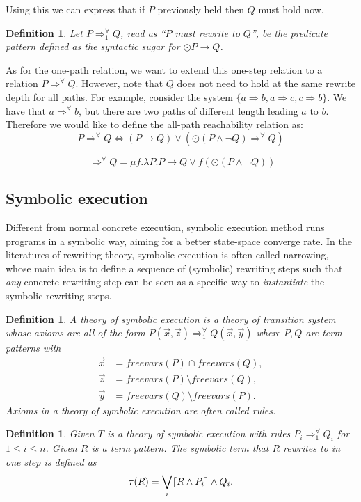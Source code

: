 \documentclass{article}
\theoremstyle{plain}
\newtheorem{defn}[thm]{Definition}
\DeclarePairedDelimiter\ceil{\lceil}{\rceil}
\def\prev{\odot}
\def\fv{\textit{freevars}}
\def\To1{\Rightarrow^{\forall}_1}
\begin{document}
Using this we can express that if $P$ previously held then $Q$ must hold now.

\begin{defn}
  Let $P \Rightarrow^\forall_1 Q$, read as ``$P$ must rewrite to $Q$'', be the predicate pattern defined as the syntactic sugar for $\prev P \to Q$.
\end{defn}

As for the one-path relation, we want to extend this one-step relation to a relation $P \Rightarrow^\forall Q$.  However, note that $Q$ does not need to hold at the same rewrite depth for all paths.  For example, consider the system $\{a \Rightarrow b, a\Rightarrow c, c\Rightarrow b\}$. We have that $a\Rightarrow^\forall b$, but there are two paths of different length leading $a$ to $b$. Therefore we would like to define the all-path reachability relation as:
\[P \Rightarrow^\forall Q \iff (P\to Q) \vee (\prev (P\wedge \neg Q) \Rightarrow^\forall Q)\]

\[\_ \Rightarrow^\forall Q = \mu f. \lambda P. P\to Q\vee f(\prev(P\wedge \neg Q))\]

\subsection{Symbolic execution}

Different from normal concrete execution, symbolic execution method runs programs in a symbolic way, aiming for a better state-space converge rate. In the literatures of rewriting theory, symbolic execution is often called narrowing, whose main idea is to define a sequence of (symbolic) rewriting steps such that \emph{any} concrete rewriting step can be seen as a specific way to \emph{instantiate} the symbolic rewriting steps. 

\begin{defn}
	A theory of symbolic execution is a theory of transition system whose axioms are all of the form $P(\vec{x}, \vec{z}) \Rightarrow^{\forall}_1 Q(\vec{x}, \vec{y})$ where $P, Q$ are term patterns with 
	\begin{align*}
\vec{x} &= \fv(P) \cap \fv(Q), \\
\vec{z} &= \fv(P) \setminus \fv(Q), \\
\vec{y} &= \fv(Q) \setminus \fv(P).
	\end{align*}
	Axioms in a theory of symbolic execution are often called \emph{rules}.
\end{defn}

\begin{defn}
Given $T$ is a theory of symbolic execution with rules $P_i \To1 Q_i$ for $1 \le i \le n$. Given $R$ is a term pattern. The symbolic term that $R$ rewrites to in one step is defined as
$$
\tau(R) = \bigvee_{i} \ceil{R \wedge P_i} \wedge Q_i.
$$
\end{defn}
\end{document}
